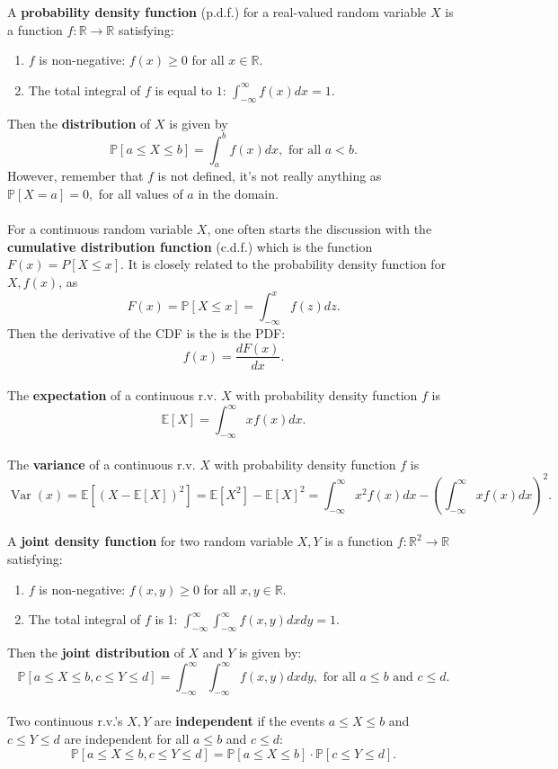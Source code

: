 \documentclass{article}
\theoremstyle{definition}
\DeclareMathOperator{\Var}{Var}
\begin{document}
A \textbf{probability density function} (p.d.f.) for a real-valued random variable $X$ is a function $f: \mathbb{R} \rightarrow \mathbb{R}$ satisfying: \begin{enumerate}
    \item $f$ is non-negative: $f(x) \geq 0$ for all $x \in \mathbb{R}.$
    \item The total integral of $f$ is equal to $1$: $\int_{-\infty}^{\infty} f(x)dx = 1.$
\end{enumerate} $ $ \\
Then the \textbf{distribution} of $X$ is given by $$\mathbb{P}[a \leq X \leq b] = \int_{a}^b f(x)dx, \text{ for all } a < b.$$ However, remember that $f$ is not defined, it's not really anything as $\mathbb{P}[X = a] = 0,$ for all values of $a$ in the domain. \\ \\
For a continuous random variable $X$, one often starts the discussion with the \textbf{cumulative distribution function} (c.d.f.) which is the function $F(x) = P[X \leq x]$. It is closely related to the probability density function for $X, f(x)$, as $$F(x) = \mathbb{P}[X \leq x] = \int_{-\infty}^x f(z) dz.$$ Then the derivative of the CDF is the is the PDF: $$f(x) = \frac{dF(x)}{dx}.$$ \\
The \textbf{expectation} of a continuous r.v. $X$ with probability density function $f$ is $$\mathbb{E}[X] = \int_{-\infty}^\infty xf(x) dx.$$ \\
The \textbf{variance} of a continuous r.v. $X$ with probability density function $f$ is $$\Var(x) = \mathbb{E}[(X - \mathbb{E}[X])^2] = \mathbb{E}[X^2] - \mathbb{E}[X]^2 = \int_{-\infty}^\infty x^2 f(x)dx - \left( \int_{-\infty}^\infty x f(x)dx \right)^2.$$ \\
A \textbf{joint density function} for two random variable $X, Y$ is a function $f: \mathbb{R}^2 \rightarrow \mathbb{R}$ satisfying: \begin{enumerate}
    \item $f$ is non-negative: $f(x, y) \geq 0$ for all $x, y \in \mathbb{R}$.
    \item The total integral of $f$ is 1: $\int_{-\infty}^\infty \int_{-\infty}^\infty f(x, y) dxdy = 1.$
\end{enumerate} Then the \textbf{joint distribution} of $X$ and $Y$ is given by: $$\mathbb{P}[a \leq X \leq b, c \leq Y \leq d] = \int_{-\infty}^\infty \int_{-\infty}^\infty f(x, y) dxdy, \text{ for all } a \leq b \text{ and } c \leq d.$$ \\
Two continuous r.v.’s $X, Y$ are \textbf{independent} if the events $a \leq X \leq b$ and $c \leq Y \leq d$ are independent for all $a \leq b$ and $c \leq d$: $$\mathbb{P}[a \leq X \leq b, c \leq Y \leq d] = \mathbb{P}[a \leq X \leq b] \cdot \mathbb{P}[c \leq Y \leq d].$$ \\
\end{document}
